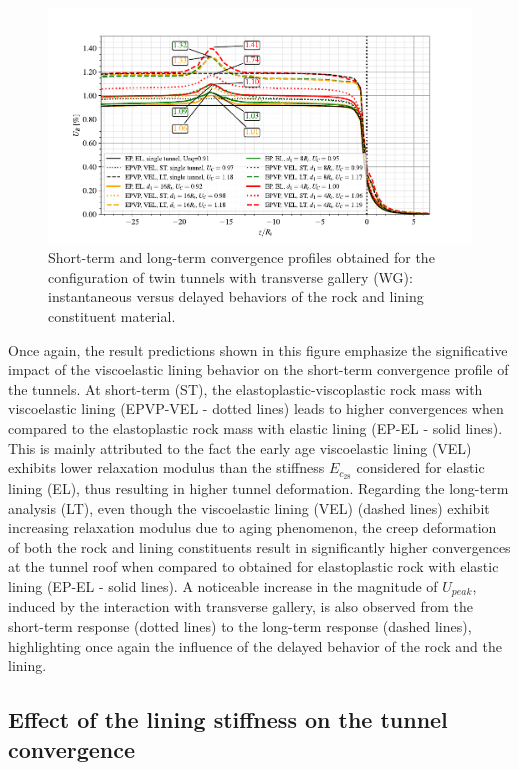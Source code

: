 \documentclass[a4paper,fleqn]{cas-sc}
\begin{document}
\begin{figure}[h!]
	\centering
	\includegraphics[scale=0.9]{Convergence Profiles - EP_EL_EPVP_VEL_WG_ST_LT_anotate.pdf}
	\caption{Short-term and long-term convergence profiles obtained for the configuration of twin tunnels with transverse gallery (WG): instantaneous versus delayed behaviors of the rock and lining constituent material.}
	\label{EP-EL-EPVP-VEL-WG-ST-LT}
\end{figure}
\FloatBarrier

Once again, the result predictions shown in this figure emphasize the significative impact of the viscoelastic lining behavior on the short-term convergence profile of the tunnels. At short-term (ST), the elastoplastic-viscoplastic rock mass with viscoelastic lining (EPVP-VEL - dotted lines) leads to higher convergences when compared to the elastoplastic rock mass with elastic lining (EP-EL - solid lines). This is mainly attributed to the fact the early age viscoelastic lining (VEL) exhibits lower relaxation modulus than the stiffness $E_{c_{28}}$ considered for elastic lining (EL), thus resulting in higher tunnel deformation. Regarding the long-term analysis (LT), even though the viscoelastic lining (VEL) (dashed lines) exhibit increasing relaxation modulus due to aging phenomenon, the creep deformation of both the rock and lining constituents result in significantly higher convergences at the tunnel roof when compared to obtained for elastoplastic rock with elastic lining (EP-EL - solid lines). A noticeable increase in the magnitude of $U_{peak}$, induced by the interaction with transverse gallery, is also observed from the short-term response (dotted lines) to the long-term response (dashed lines), highlighting once again the influence of the delayed behavior of the rock and the lining.

\subsection{Effect of the lining stiffness on the tunnel convergence}\label{}
\end{document}
